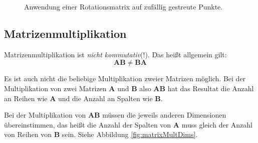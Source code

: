 \begin{figure}[H]
    \centering
    
    \caption{Anwendung einer Rotationsmatrix auf zufällig gestreute Punkte.}
    \label{fig:rotMat}
\end{figure}






\subsection*{Matrizenmultiplikation}


Matrizenmultiplikation ist \emph{nicht kommutativ}(!). Das heißt allgemein gilt:
\begin{equation}
    \mathbf{AB} \neq \mathbf{BA}
\end{equation}

Es ist auch nicht die beliebige Multiplikation zweier Matrizen möglich. Bei der Multiplikation von zwei Matrizen $\mathbf{A}$ und $\mathbf{B}$ also $\mathbf{AB}$ hat das Resultat die Anzahl an Reihen wie $\mathbf{A}$ und die Anzahl an Spalten wie $\mathbf{B}$. 

Bei der Multiplikation von $\mathbf{AB}$ müssen die jeweils anderen Dimensionen übereinstimmen, das heißt die Anzahl der Spalten von $\mathbf{A}$ muss gleich der Anzahl von Reihen von $\mathbf{B}$ sein. Siehe Abbildung \ref{fig:matrixMultDims}.


